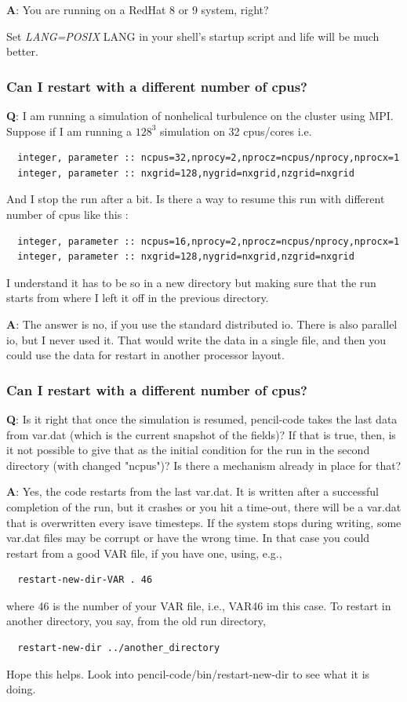 \documentclass[\mydriver,12pt,twoside,notitlepage,a4paper]{article}
\makeatletter
\newcommand{\var}[2][]{%
  \def\index@{#1}%
  \textsl{#2\/}%
  \ifx\index@\@empty\index[var]{#2@\emph{#2}}%
  \else\index[var]{#1@\emph{#1}}%
  \fi%
}
\makeatother
\begin{document}
{\bf A}:
You are running on a RedHat 8 or 9 system, right?

Set \var[LANG]{LANG=POSIX} in your shell's startup script and life will be
much better.

\subsubsection{Can I restart with a different number of cpus?}

{\bf Q}:
I am running a simulation of nonhelical turbulence on the cluster
using MPI. Suppose if I am running a $128^3$ simulation on 32 cpus/cores i.e.
\begin{Verbatim}
  integer, parameter :: ncpus=32,nprocy=2,nprocz=ncpus/nprocy,nprocx=1
  integer, parameter :: nxgrid=128,nygrid=nxgrid,nzgrid=nxgrid
\end{Verbatim}
And I stop the run after a bit. Is there a way to resume this run with
different number of cpus like this :
\begin{Verbatim}
  integer, parameter :: ncpus=16,nprocy=2,nprocz=ncpus/nprocy,nprocx=1
  integer, parameter :: nxgrid=128,nygrid=nxgrid,nzgrid=nxgrid
\end{Verbatim}
I understand it has to be so in a new directory but making sure that
the run starts from where I left it off in the previous directory.

{\bf A}:
The answer is no, if you use the standard distributed io.
There is also parallel io, but I never used it.
That would write the data in a single file, and then you could use the
data for restart in another processor layout.

\subsubsection{Can I restart with a different number of cpus?}

{\bf Q}:
Is it right that once the simulation is resumed, pencil-code takes the
last data from var.dat (which is the current snapshot of the fields)?
If that is true, then, is it not possible to give that as the initial
condition for the run in the second directory (with changed "ncpus")?
Is there a mechanism already in place for that?

{\bf A}:
Yes, the code restarts from the last var.dat. It is written after a
successful completion of the run, but it crashes or you hit a time-out,
there will be a var.dat that is overwritten every isave timesteps.
If the system stops during writing, some var.dat files may be corrupt
or have the wrong time. In that case you could restart from a good VAR
file, if you have one, using, e.g.,
\begin{Verbatim}
  restart-new-dir-VAR . 46
\end{Verbatim}
where 46 is the number of your VAR file, i.e., VAR46 im this case.
To restart in another directory, you say, from the old run directory,
\begin{Verbatim}
  restart-new-dir ../another_directory
\end{Verbatim}
Hope this helps.
Look into pencil-code/bin/restart-new-dir to see what it is doing.
\end{document}
